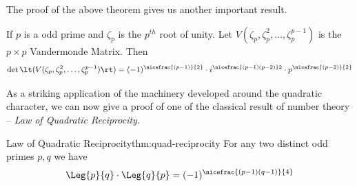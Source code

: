 The proof of the above theorem gives us another important result. 
\begin{lemma}{}{}
  If $p$ is a odd prime and $\zeta_p$ is the $p^{th}$ root of unity. Let $V(\zeta_p,\zeta_p^2,\dots,\zeta_p^{p-1})$ is the $p\times p$ Vandermonde Matrix. Then $$\det\lt(V(\zeta_p,\zeta_p^2,\dots,\zeta_p^{p-1})\rt)=(-1)^{\nicefrac{(p-1)}{2}}\cdot i^{\nicefrac{(p-1)(p-2)}2}\cdot p^{\nicefrac{(p-2)}{2}}$$
\end{lemma}

As a striking application of the machinery developed around the quadratic character, we can now give a proof of one of the classical result of  number theory -- \emph{Law of Quadratic Reciprocity}.
\begin{Theorem}{Law of Quadratic Reciprocity}{thm:quad-reciprocity}
  For any two distinct odd primes $p,q$ we have $$\Leg{p}{q}\cdot \Leg{q}{p}=(-1)^{\nicefrac{(p-1)(q-1)}{4}}$$
\end{Theorem}
